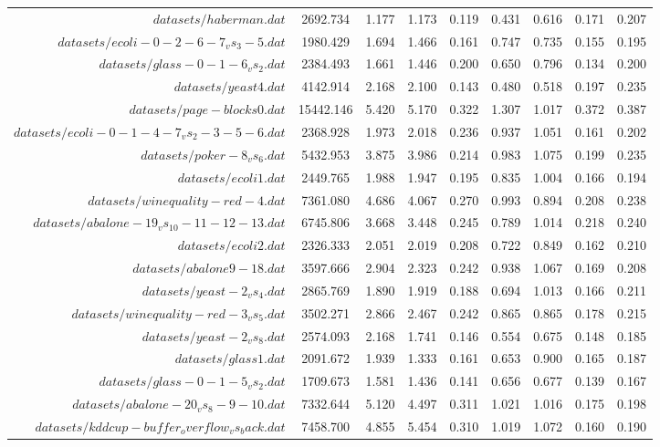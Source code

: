 \begin{table}[!ht]
{\begin{tabular}{r c c c c c c c c}
$datasets/haberman.dat$ & 2692.734 & 1.177 & 1.173 & 0.119 & 0.431 & 0.616 & 0.171 & 0.207 \\
$datasets/ecoli-0-2-6-7_vs_3-5.dat$ & 1980.429 & 1.694 & 1.466 & 0.161 & 0.747 & 0.735 & 0.155 & 0.195 \\
$datasets/glass-0-1-6_vs_2.dat$ & 2384.493 & 1.661 & 1.446 & 0.200 & 0.650 & 0.796 & 0.134 & 0.200 \\
$datasets/yeast4.dat$ & 4142.914 & 2.168 & 2.100 & 0.143 & 0.480 & 0.518 & 0.197 & 0.235 \\
$datasets/page-blocks0.dat$ & 15442.146 & 5.420 & 5.170 & 0.322 & 1.307 & 1.017 & 0.372 & 0.387 \\
$datasets/ecoli-0-1-4-7_vs_2-3-5-6.dat$ & 2368.928 & 1.973 & 2.018 & 0.236 & 0.937 & 1.051 & 0.161 & 0.202 \\
$datasets/poker-8_vs_6.dat$ & 5432.953 & 3.875 & 3.986 & 0.214 & 0.983 & 1.075 & 0.199 & 0.235 \\
$datasets/ecoli1.dat$ & 2449.765 & 1.988 & 1.947 & 0.195 & 0.835 & 1.004 & 0.166 & 0.194 \\
$datasets/winequality-red-4.dat$ & 7361.080 & 4.686 & 4.067 & 0.270 & 0.993 & 0.894 & 0.208 & 0.238 \\
$datasets/abalone-19_vs_10-11-12-13.dat$ & 6745.806 & 3.668 & 3.448 & 0.245 & 0.789 & 1.014 & 0.218 & 0.240 \\
$datasets/ecoli2.dat$ & 2326.333 & 2.051 & 2.019 & 0.208 & 0.722 & 0.849 & 0.162 & 0.210 \\
$datasets/abalone9-18.dat$ & 3597.666 & 2.904 & 2.323 & 0.242 & 0.938 & 1.067 & 0.169 & 0.208 \\
$datasets/yeast-2_vs_4.dat$ & 2865.769 & 1.890 & 1.919 & 0.188 & 0.694 & 1.013 & 0.166 & 0.211 \\
$datasets/winequality-red-3_vs_5.dat$ & 3502.271 & 2.866 & 2.467 & 0.242 & 0.865 & 0.865 & 0.178 & 0.215 \\
$datasets/yeast-2_vs_8.dat$ & 2574.093 & 2.168 & 1.741 & 0.146 & 0.554 & 0.675 & 0.148 & 0.185 \\
$datasets/glass1.dat$ & 2091.672 & 1.939 & 1.333 & 0.161 & 0.653 & 0.900 & 0.165 & 0.187 \\
$datasets/glass-0-1-5_vs_2.dat$ & 1709.673 & 1.581 & 1.436 & 0.141 & 0.656 & 0.677 & 0.139 & 0.167 \\
$datasets/abalone-20_vs_8-9-10.dat$ & 7332.644 & 5.120 & 4.497 & 0.311 & 1.021 & 1.016 & 0.175 & 0.198 \\
$datasets/kddcup-buffer_overflow_vs_back.dat$ & 7458.700 & 4.855 & 5.454 & 0.310 & 1.019 & 1.072 & 0.160 & 0.190 \\

\end{tabular}}
\end{table}
